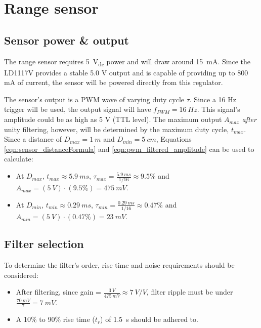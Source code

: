 \graphicspath{{content/2_design/figures/}}
\section{Range sensor}
\subsection{Sensor power \& output}
The range sensor requires \SI{5}{V_{dc}} power and will draw around \SI{15}{mA}. Since the LD1117V provides a stable 5.0 V output and is capable
of providing up to 800 mA of current, the sensor will be powered directly from this regulator.

The sensor's output is a PWM wave of varying duty cycle $\tau$. Since a 16 Hz trigger will be used, the output signal
will have $f_{PWM} = \SI{16}{Hz}$. This signal's amplitude could be as high as 5 V (TTL level). The maximum output $A_{max}$ \textit{after} unity filtering,
however, will be determined by the maximum duty cycle, $t_{max}$. Since a distance of $D_{max} = \SI{1}{m}$ and $D_{min} = \SI{5}{cm}$,
Equations \ref{eqn:sensor_distanceFormula} and \ref{eqn:pwm_filtered_amplitude} can be used to calculate:
\begin{itemize}
  \item At $D_{max}$, $t_{max} \approx \SI{5.9}{ms}$, $\tau_{max} = \frac{\SI{5.9}{ms}}{1/16} \approx 9.5 \%$ and $A_{max} = (\SI{5}{V}) \cdot (9.5 \%) = \SI{475}{mV} $.
  \item At $D_{min}$, $t_{min} \approx \SI{0.29}{ms}$, $\tau_{min} = \frac{\SI{0.29}{ms}}{1/16} \approx 0.47 \%$ and $A_{min} = (\SI{5}{V}) \cdot (0.47 \%) = \SI{23}{mV} $.
\end{itemize}

\subsection{Filter selection}{\label{rangeSensor_design_filter}}

To determine the filter's order, rise time and noise requirements should be considered:
\begin{itemize}
  \item After filtering, since gain = $\frac{\SI{3}{V}}{\SI{475}{mV}} \approx \SI{7}{V/V}$, filter ripple must be under $ \frac{\SI{70}{mV}}{7} = \SI{7}{mV}$.
  \item A 10\% to 90\% rise time ($t_r$) of \SI{1.5}{s} should be adhered to.
\end{itemize}


